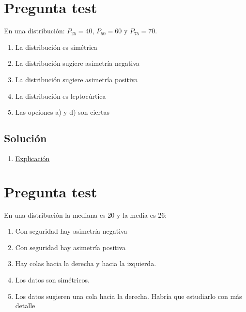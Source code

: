 \documentclass[
]{book}
\providecommand{\tightlist}{%
  \setlength{\itemsep}{0pt}\setlength{\parskip}{0pt}}
\begin{document}
\hypertarget{pregunta-test-56}{%
\section{Pregunta test}\label{pregunta-test-56}}

En una distribución: \(P_{25} = 40\), \(P_{50} =60\) y \(P_{75} =70\).

\begin{enumerate}
\def\labelenumi{\alph{enumi})}
\tightlist
\item
  La distribución es simétrica
\item
  La distribución sugiere asimetría negativa
\item
  La distribución sugiere asimetría positiva
\item
  La distribución es leptocúrtica
\item
  Las opciones a) y d) son ciertas
\end{enumerate}

\hypertarget{soluciuxf3n-58}{%
\subsection{Solución}\label{soluciuxf3n-58}}

\begin{enumerate}
\def\labelenumi{\alph{enumi})}
\setcounter{enumi}{1}
\tightlist
\item
  \href{https://1fjmanzano.github.io/bioestadistica/medidas-de-forma.html}{Explicación}
\end{enumerate}

\hypertarget{pregunta-test-57}{%
\section{Pregunta test}\label{pregunta-test-57}}

En una distribución la mediana es 20 y la media es 26:

\begin{enumerate}
\def\labelenumi{\alph{enumi})}
\tightlist
\item
  Con seguridad hay asimetría negativa
\item
  Con seguridad hay asimetría positiva
\item
  Hay colas hacia la derecha y hacia la izquierda.
\item
  Los datos son simétricos.
\item
  Los datos sugieren una cola hacia la derecha. Habría que estudiarlo con más detalle
\end{enumerate}
\end{document}
